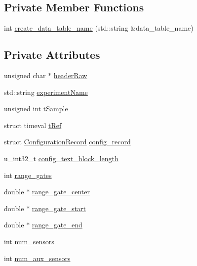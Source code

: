 \subsection*{Private Member Functions}
\begin{DoxyCompactItemize}
\item 
int \hyperlink{classwindtracer_af9d739964c034029c99e283a283b506f}{create\-\_\-data\-\_\-table\-\_\-name} (std\-::string \&data\-\_\-table\-\_\-name)
\end{DoxyCompactItemize}
\subsection*{Private Attributes}
\begin{DoxyCompactItemize}
\item 
unsigned char $\ast$ \hyperlink{classwindtracer_a0fd43967f940c29d8977eb1240696d81}{header\-Raw}
\item 
std\-::string \hyperlink{classwindtracer_aa0b5d56c9d831360a9a57b6652a9bce0}{experiment\-Name}
\item 
unsigned int \hyperlink{classwindtracer_ac1445c6c8d23eb15c58034163ca8aacd}{t\-Sample}
\item 
struct timeval \hyperlink{classwindtracer_ac5ff90382dacf3ee0a23602f7416b3b5}{t\-Ref}
\item 
struct \hyperlink{structConfigurationRecord}{Configuration\-Record} \hyperlink{classwindtracer_a5d67866d830f38f37ac8b0c69c6f7378}{config\-\_\-record}
\item 
u\-\_\-int32\-\_\-t \hyperlink{classwindtracer_ade65f374d3b610d90658a3d0bbbf5111}{config\-\_\-text\-\_\-block\-\_\-length}
\item 
int \hyperlink{classwindtracer_a6352be627e3d05ee0767550ede2654b6}{range\-\_\-gates}
\item 
double $\ast$ \hyperlink{classwindtracer_af81c7fd1af56fc55b07d4c2253a409d1}{range\-\_\-gate\-\_\-center}
\item 
double $\ast$ \hyperlink{classwindtracer_af1c976835951ac79c4f26219fe1eac20}{range\-\_\-gate\-\_\-start}
\item 
double $\ast$ \hyperlink{classwindtracer_a61691581de3e6322086ba201d2c468a2}{range\-\_\-gate\-\_\-end}
\item 
int \hyperlink{classwindtracer_ac203ed51cd1cee3e910adcc6ad007bb0}{num\-\_\-sensors}
\item 
int \hyperlink{classwindtracer_a7f9c0a2573aa664a8b7a7ba046ae2757}{num\-\_\-aux\-\_\-sensors}
\end{DoxyCompactItemize}

